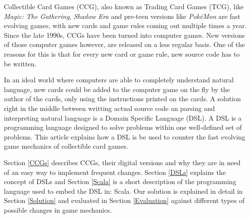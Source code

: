 Collectible Card Games (CCG), also known as Trading Card Games (TCG), like \textit{Magic: The Gathering}, \textit{Shadow Era} and pre-teen versions like \textit{Pok\'eMon} are fast evolving games, with new cards and game rules coming out multiple times a year. Since the late 1990s, CCGs have been turned into computer games. New versions of those computer games however, are released on a less regular basis. One of the reasons for this is that for every new card or game rule, new source code has to be written.

In an ideal world where computers are able to completely understand natural language, new cards could be added to the computer game on the fly by the author of the cards, only using the instructions printed on the cards. A solution right in the middle between writting actual source code an parsing and interpreting natural language is a Domain Specific Language (DSL). A DSL is a programming language designed to solve problems within one well-defined set of problems. This article explains how a DSL is be used to counter the fast evolving game mechanics of collectible card games.

Section \ref{CCGs} describes CCGs, their digital versions and why they are in need of an easy way to implement frequent changes. Section \ref{DSLs} explains the concept of DSLs and Section \ref{Scala} is a short description of the programming language used to embed the DSL in: Scala.
Our solution is explained in detail in Section \ref{Solution} and evaluated in Section \ref{Evaluation} against different types of possible changes in game mechanics.
